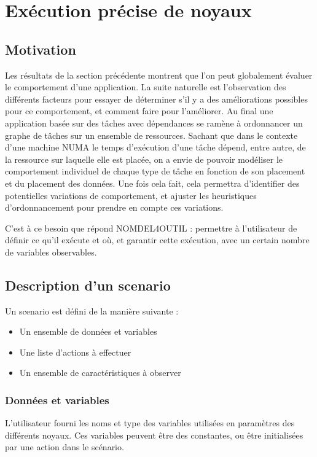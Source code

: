 \section{Exécution précise de noyaux}\label{sec:contribs:outil}

\subsection{Motivation}

Les résultats de la section précédente montrent que l'on peut globalement évaluer le comportement d'une application.
La suite naturelle est l'observation des différents facteurs pour essayer de déterminer s'il y a des améliorations possibles pour ce comportement, et comment faire pour l'améliorer.
Au final une application basée sur des tâches avec dépendances se ramène à ordonnancer un graphe de tâches sur un ensemble de ressources.
Sachant que dans le contexte d'une machine NUMA le temps d'exécution d'une tâche dépend, entre autre, de la ressource sur laquelle elle est placée, on a envie de pouvoir modéliser le comportement individuel de chaque type de tâche en fonction de son placement et du placement des données.
Une fois cela fait, cela permettra d'identifier des potentielles variations de comportement, et ajuster les heuristiques d'ordonnancement pour prendre en compte ces variations.

C'est à ce besoin que répond NOMDEL4OUTIL : permettre à l'utilisateur de définir ce qu'il exécute et où, et garantir cette exécution, avec un certain nombre de variables observables.

\subsection{Description d'un scenario}

Un scenario est défini de la manière suivante :
\begin{itemize}
 \item Un ensemble de données et variables
 \item Une liste d'actions à effectuer
 \item Un ensemble de caractéristiques à observer
\end{itemize}

\subsubsection{Données et variables}

L'utilisateur fourni les noms et type des variables utilisées en paramètres des différents noyaux.
Ces variables peuvent être des constantes, ou être initialisées par une action dans le scénario.

